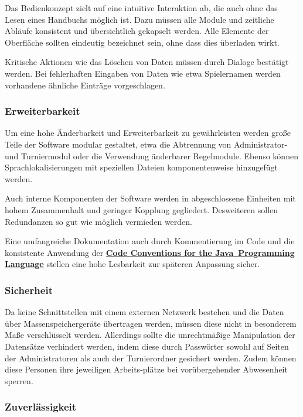 \documentclass[11pt]{article}
\begin{document}
Das Bedienkonzept zielt auf eine intuitive Interaktion ab, die auch ohne das Lesen eines Handbuchs möglich ist. Dazu müssen alle Module und zeitliche Abläufe konsistent und übersichtlich gekapselt werden. Alle Elemente der Oberfläche sollten eindeutig bezeichnet sein, ohne dass dies überladen wirkt.

Kritische Aktionen wie das Löschen von Daten müssen durch Dialoge bestätigt werden. Bei fehlerhaften Eingaben von Daten wie etwa Spielernamen werden vorhandene ähnliche Einträge vorgeschlagen.

\subsubsection{Erweiterbarkeit}

Um eine hohe Änderbarkeit und Erweiterbarkeit zu gewährleisten werden große Teile der Software modular gestaltet, etwa die Abtrennung von Administrator- und Turniermodul oder die Verwendung änderbarer Regelmodule. Ebenso können Sprachlokalisierungen mit speziellen Dateien komponentenweise hinzugefügt werden.

Auch interne Komponenten der Software werden in abgeschlossene Einheiten mit hohem Zusammenhalt und geringer Kopplung gegliedert. Desweiteren sollen Redundanzen so gut wie möglich vermieden werden.

Eine umfangreiche Dokumentation auch durch Kommentierung im Code und die konsistente Anwendung der \href{http://www.oracle.com/technetwork/java/codeconvtoc-136057.html}{\textbf{Code Conventions for the Java\texttrademark\ Programming Language}} stellen eine hohe Lesbarkeit zur späteren Anpassung sicher.

\subsubsection{Sicherheit}

Da keine Schnittstellen mit einem externen Netzwerk bestehen und die Daten über Massenspeichergeräte übertragen werden, müssen diese nicht in besonderem Maße verschlüsselt werden. Allerdings sollte die unrechtmäßige Manipulation der Datensätze verhindert werden, indem diese durch Passwörter sowohl auf Seiten der Administratoren als auch der Turnierordner gesichert werden. Zudem können diese Personen ihre jeweiligen Arbeits-plätze bei vorübergehender Abwesenheit sperren.

\newpage

\subsubsection{Zuverlässigkeit}
\end{document}

